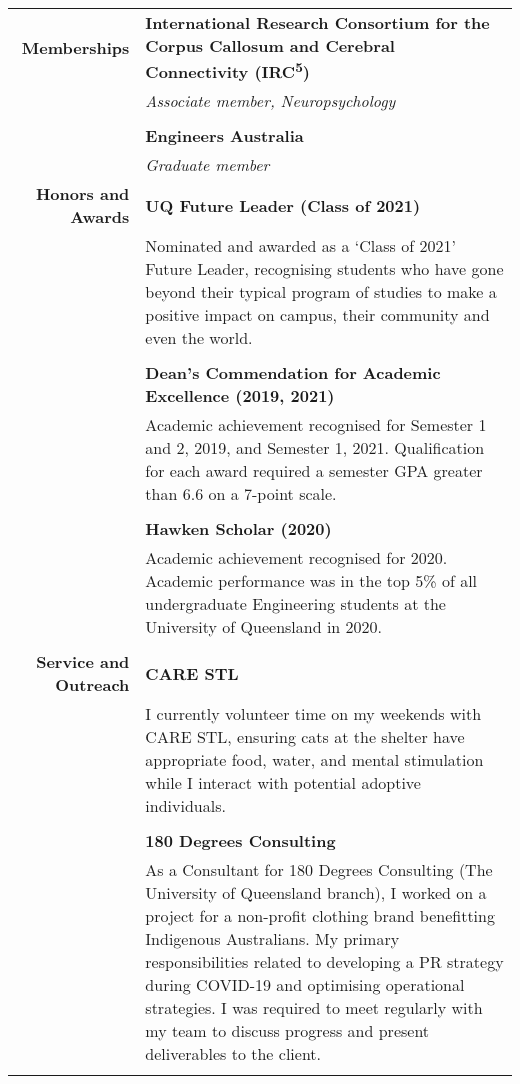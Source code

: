 \documentclass{article}
\begin{document}
\begin{longtable}{r | p{13cm}}
		\large\textbf{Memberships} 	  		& \large\textbf{International Research Consortium for the Corpus Callosum and Cerebral Connectivity (IRC\textsuperscript{5})} \\
											& \textit{Associate member, Neuropsychology} \\ 
											& \\

											& \large\textbf{Engineers Australia} \\
											& \textit{Graduate member} \\

											\pagebreak

		\large\textbf{Honors and Awards}	& \large\textbf{UQ Future Leader (Class of 2021)} \\
											& Nominated and awarded as a `Class of 2021' Future Leader, recognising students who have gone beyond their typical program of studies to make a positive impact on campus, their community and even the world. \\
											& \\

											& \large\textbf{Dean's Commendation for Academic Excellence (2019, 2021)} \\
											& Academic achievement recognised for Semester 1 and 2, 2019, and Semester 1, 2021. Qualification for each award required a semester GPA greater than 6.6 on a 7-point scale. \\
											& \\

											& \large\textbf{Hawken Scholar (2020)} \\
											& Academic achievement recognised for 2020. Academic performance was in the top 5\% of all undergraduate Engineering students at the University of Queensland in 2020. \\
											& \\

		\large\textbf{Service and Outreach}	& \large\textbf{CARE STL} \\
											& I currently volunteer time on my weekends with CARE STL, ensuring cats at the shelter have appropriate food, water, and mental stimulation while I interact with potential adoptive individuals. \\	
											& \\

											& \large\textbf{180 Degrees Consulting} \\
											& As a Consultant for 180 Degrees Consulting (The University of Queensland branch), I worked on a project for a non-profit clothing brand benefitting Indigenous Australians. My primary responsibilities related to developing a PR strategy during COVID-19 and optimising operational strategies. I was required to meet regularly with my team to discuss progress and present deliverables to the client. \\	
											& \\


\end{longtable}
\end{document}

